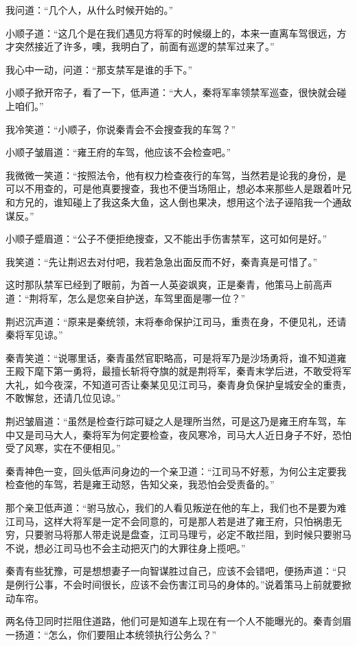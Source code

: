 我问道：“几个人，从什么时候开始的。”

小顺子道：“这几个是在我们遇见方将军的时候缀上的，本来一直离车驾很远，方才突然接近了许多，噢，我明白了，前面有巡逻的禁军过来了。”

我心中一动，问道：“那支禁军是谁的手下。”

小顺子掀开帘子，看了一下，低声道：“大人，秦将军率领禁军巡查，很快就会碰上咱们。”

我冷笑道：“小顺子，你说秦青会不会搜查我的车驾？”

小顺子皱眉道：“雍王府的车驾，他应该不会检查吧。”

我微微一笑道：“按照法令，他有权力检查夜行的车驾，当然若是论我的身份，是可以不用查的，可是他真要搜查，我也不便当场阻止，想必本来那些人是跟着叶兄和方兄的，谁知碰上了我这条大鱼，这人倒也果决，想用这个法子诬陷我一个通敌谋反。”

小顺子蹙眉道：“公子不便拒绝搜查，又不能出手伤害禁军，这可如何是好。”

我笑道：“先让荆迟去对付吧，我若急急出面反而不好，秦青真是可惜了。”

这时那队禁军已经到了眼前，为首一人英姿飒爽，正是秦青，他策马上前高声道：“荆将军，怎么是您亲自护送，车驾里面是哪一位？”

荆迟沉声道：“原来是秦统领，末将奉命保护江司马，重责在身，不便见礼，还请秦将军见谅。”

秦青笑道：“说哪里话，秦青虽然官职略高，可是将军乃是沙场勇将，谁不知道雍王殿下麾下第一勇将，最擅长斩将夺旗的就是荆将军，秦青末学后进，不敢受将军大礼，如今夜深，不知道可否让秦某见见江司马，秦青身负保护皇城安全的重责，不敢懈怠，还请几位见谅。”

荆迟皱眉道：“虽然是检查行踪可疑之人是理所当然，可是这乃是雍王府车驾，车中又是司马大人，秦将军为何定要检查，夜风寒冷，司马大人近日身子不好，恐怕受了风寒，实在不便相见。”

秦青神色一变，回头低声问身边的一个亲卫道：“江司马不好惹，为何公主定要我检查他的车驾，若是雍王动怒，告知父亲，我恐怕会受责备的。”

那个亲卫低声道：“驸马放心，我们的人看见叛逆在他的车上，我们也不是要为难江司马，这样大将军是一定不会同意的，可是那人若是进了雍王府，只怕祸患无穷，只要驸马将那人带走说是盘查，江司马理亏，必定不敢拦阻，到时候只要驸马不说，想必江司马也不会主动把灭门的大罪往身上揽吧。”

秦青有些犹豫，可是想想妻子一向智谋胜过自己，应该不会错吧，便扬声道：“只是例行公事，不会时间很长，应该不会伤害江司马的身体的。”说着策马上前就要掀动车帘。

两名侍卫同时拦阻住道路，他们可是知道车上现在有一个人不能曝光的。秦青剑眉一扬道：“怎么，你们要阻止本统领执行公务么？”

